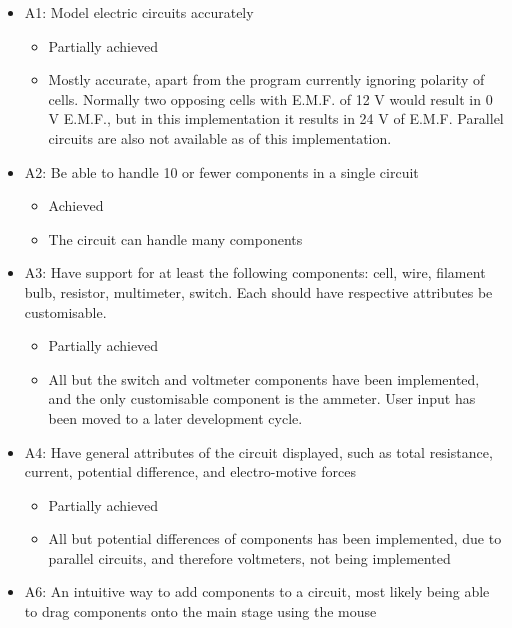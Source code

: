     \begin{itemize}
        \item A1: Model electric circuits accurately
        \begin{itemize}
            \item Partially achieved
            \item Mostly accurate, apart from the program currently ignoring polarity of cells. Normally two opposing cells with E.M.F. of 12 V would result in 0 V E.M.F., but in this implementation it results in 24 V of E.M.F. Parallel circuits are also not available as of this implementation.
        \end{itemize}
        \item A2: Be able to handle 10 or fewer components in a single circuit
        \begin{itemize}
            \item Achieved
            \item The circuit can handle many components
        \end{itemize}
        \item A3: Have support for at least the following components: cell, wire, filament bulb, resistor, multimeter, switch. Each should have respective attributes be customisable.
        \begin{itemize}
            \item Partially achieved
            \item All but the switch and voltmeter components have been implemented, and the only customisable component is the ammeter. User input has been moved to a later development cycle.
        \end{itemize}
        \item A4: Have general attributes of the circuit displayed, such as total resistance, current, potential difference, and electro-motive forces
        \begin{itemize}
            \item Partially achieved
            \item All but potential differences of components has been implemented, due to parallel circuits, and therefore voltmeters, not being implemented
        \end{itemize}
        \item A6: An intuitive way to add components to a circuit, most likely being able to drag components onto the main stage using the mouse
        \begin{itemize}

\end{itemize}
\end{itemize}
